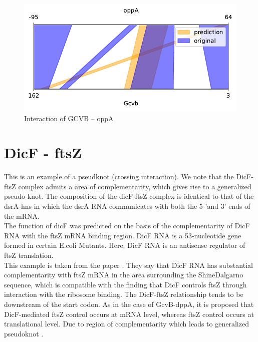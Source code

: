 \documentclass[twoside,a4paper]{report}
\begin{document}
	\begin{figure}[h!tb]
	\includegraphics[width=.5\linewidth]{rricomparison6}
	\centering
	\caption{ Interaction of GCVB – oppA } 
	\label{fig:rricomparison6}
\end{figure}


\clearpage
	
%	
	
	\section{DicF - ftsZ }
	
	This is an example of a pseudknot (crossing interaction). We note that the DicF-ftsZ complex admits a area of complementarity, which gives rise to a generalized pseudo-knot. The composition of the dicF-ftsZ complex is identical to that of the dsrA-hns in which the dsrA RNA communicates with both the 5 'and 3' ends of the mRNA.\\   
	
	The function of dicF was predicted on the basis of the complementarity of DicF RNA with the ftsZ mRNA binding region. DicF RNA is a 53-nucleotide gene formed in certain E.coli Mutants. Here, DicF RNA is an antisense regulator of ftsZ translation.\\
	
	This example is taken from the paper \citep{pervouchine2004iris}. They say that DicF RNA has substantial complementarity with ftsZ mRNA in the area surrounding the ShineDalgarno sequence, which is compatible with the finding that DicF controls ftsZ through interaction with the ribosome binding. The DicF-ftsZ relationship tends to be downstream of the start codon. As in the case of GcvB-dppA, it is proposed that DicF-mediated ftsZ control occurs at mRNA level, whereas ftsZ control occurs at translational level. Due to region of complementarity which leads to generalized pseudoknot  . \\
	
\end{document}
